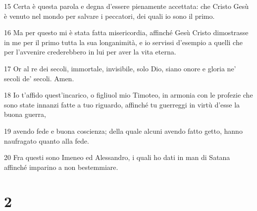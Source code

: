 \par 15 Certa è questa parola e degna d'essere pienamente accettata: che Cristo Gesù è venuto nel mondo per salvare i peccatori, dei quali io sono il primo.
\par 16 Ma per questo mi è stata fatta misericordia, affinché Gesù Cristo dimostrasse in me per il primo tutta la sua longanimità, e io servissi d'esempio a quelli che per l'avvenire crederebbero in lui per aver la vita eterna.
\par 17 Or al re dei secoli, immortale, invisibile, solo Dio, siano onore e gloria ne' secoli de' secoli. Amen.
\par 18 Io t'affido quest'incarico, o figliuol mio Timoteo, in armonia con le profezie che sono state innanzi fatte a tuo riguardo, affinché tu guerreggi in virtù d'esse la buona guerra,
\par 19 avendo fede e buona coscienza; della quale alcuni avendo fatto getto, hanno naufragato quanto alla fede.
\par 20 Fra questi sono Imeneo ed Alessandro, i quali ho dati in man di Satana affinché imparino a non bestemmiare.

\chapter{2}

